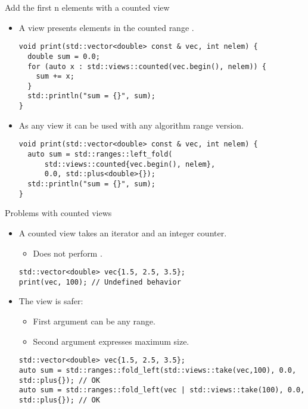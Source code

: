 \begin{frame}[t,fragile]{Add the first n elements with a counted view}
\begin{itemize}
  \item A  view presents elements in the counted range
        \textmark{[i, i+n)}.
\begin{lstlisting}
void print(std::vector<double> const & vec, int nelem) {
  double sum = 0.0;
  for (auto x : std::views::counted(vec.begin(), nelem)) {
    sum += x;
  }
  std::println("sum = {}", sum);
}
\end{lstlisting}

  \item As any view it can be used with any algorithm range version.
\begin{lstlisting}
void print(std::vector<double> const & vec, int nelem) {
  auto sum = std::ranges::left_fold(
      std::views::counted{vec.begin(), nelem},
      0.0, std::plus<double>{});
  std::println("sum = {}", sum);
}
\end{lstlisting}
\end{itemize}
\end{frame}

\begin{frame}[t,fragile]{Problems with counted views}
\begin{itemize}
  \item A counted view takes an iterator and an integer counter.
    \begin{itemize}
      \item Does not perform .
    \end{itemize}
\begin{lstlisting}
std::vector<double> vec{1.5, 2.5, 3.5};
print(vec, 100); // Undefined behavior
\end{lstlisting}

  \item The  view is safer:
    \begin{itemize}
      \item First argument can be any range.
      \item Second argument expresses maximum size.
    \end{itemize}
\begin{lstlisting}
std::vector<double> vec{1.5, 2.5, 3.5};
auto sum = std::ranges::fold_left(std::views::take(vec,100), 0.0, std::plus{}); // OK
auto sum = std::ranges::fold_left(vec | std::views::take(100), 0.0, std::plus{}); // OK
\end{lstlisting}
\end{itemize}
\end{frame}
